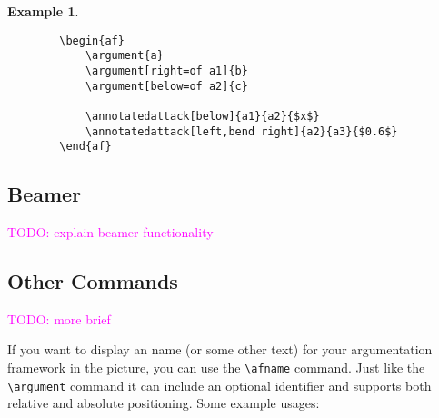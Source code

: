 \documentclass[headings=normal]{scrartcl}
\newcommand{\todo}[1]{\textcolor{magenta}{TODO: #1}} %
\newtheorem{example}{Example}
\begin{document}
    \begin{example}~

    \begin{minipage}{0.18\textwidth}
        \begin{center}
        \begin{af}
    
        \end{af}
        \end{center}
    \end{minipage}%
    \begin{minipage}{0.5\textwidth}
        \begin{verbatim}
        \begin{af}
            \argument{a}
            \argument[right=of a1]{b}
            \argument[below=of a2]{c}
    
            \annotatedattack[below]{a1}{a2}{$x$}
            \annotatedattack[left,bend right]{a2}{a3}{$0.6$}
        \end{af}
        \end{verbatim}
    \end{minipage}%
    \end{example}


\subsection{Beamer}\label{sec:beamer}
\todo{explain beamer functionality}


\subsection{Other Commands}
    \todo{more brief}

    If you want to display an name (or some other text) for your argumentation framework in the picture, you can use the \verb|\afname| command.
    Just like the \verb|\argument| command it can include an optional identifier and supports both relative and absolute positioning.
    Some example usages:\\
\end{document}
